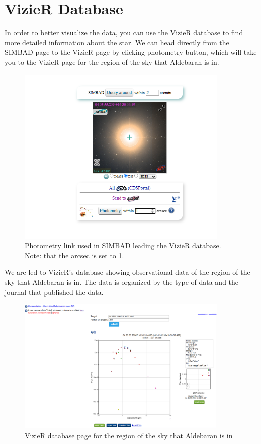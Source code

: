 \documentclass[12pt,oneside,a4paper,english]{article}
\begin{document}
\section{VizieR Database}
In order to better visualize the data, you can use the VizieR database to find more detailed information about the star. We can head directly from the SIMBAD page to the VizieR page by clicking photometry button, which will take you to the VizieR page for the region of the sky that Aldebaran is in.
\begin{figure}[H]
    \centering
    \includegraphics[width=0.9\textwidth]{SINBAD4.png}
    \caption{Photometry link used in SIMBAD leading the VizieR database. Note: that the arcsec is set to 1.\cite{sinbad}}
    \label{fig:sinbadphotometry}
\end{figure}
We are led to VizieR's database showing observational data of the region of the sky that Aldebaran is in. The data is organized by the type of data and the journal that published the data.
\begin{figure}[H]
    \centering
    \includegraphics[width=0.9\textwidth]{VizieR1.png}
    \caption{VizieR database page for the region of the sky that Aldebaran is in\cite{vizier}}
    \label{fig:vizier}
\end{figure}
\end{document}
